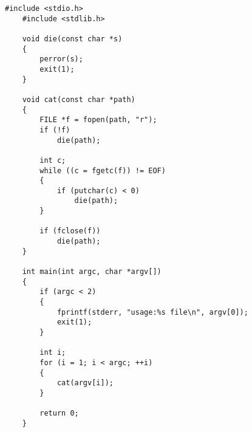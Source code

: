 \documentclass[12pt]{jarticle}
\begin{document}
\begin{lstlisting}[caption=read\_3\_fgetc.c,label=read2, style=lstC]
    #include <stdio.h>
    #include <stdlib.h>
    
    void die(const char *s)
    {
        perror(s);
        exit(1);
    }
    
    void cat(const char *path)
    {
        FILE *f = fopen(path, "r");
        if (!f)
            die(path);
    
        int c;
        while ((c = fgetc(f)) != EOF)
        {
            if (putchar(c) < 0)
                die(path);
        }
    
        if (fclose(f))
            die(path);
    }
    
    int main(int argc, char *argv[])
    {
        if (argc < 2)
        {
            fprintf(stderr, "usage:%s file\n", argv[0]);
            exit(1);
        }
    
        int i;
        for (i = 1; i < argc; ++i)
        {
            cat(argv[i]);
        }
    
        return 0;
    }
\end{lstlisting}
\clearpage
\end{document}
